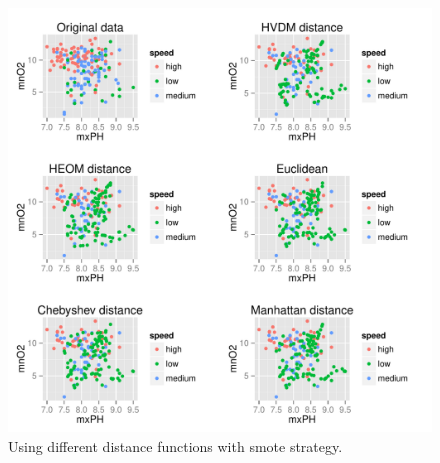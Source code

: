 \documentclass[10pt,a4paper]{article}\usepackage[]{graphicx}\usepackage[]{color}
\makeatletter
\def\maxwidth{ %
  \ifdim\Gin@nat@width>\linewidth
    \linewidth
  \else
    \Gin@nat@width
  \fi
}
\newenvironment{knitrout}{}{} %
\makeatother
\begin{document}
\begin{knitrout}\footnotesize
{}\color{fgcolor}\begin{figure}

{\centering \includegraphics[width=\maxwidth]{figures/UBL-dist_HVDM2-1} 

}

\caption[Using different distance functions with  smote strategy]{Using different distance functions with  smote strategy.}\label{fig:dist_HVDM2}
\end{figure}


\end{knitrout}
\end{document}
